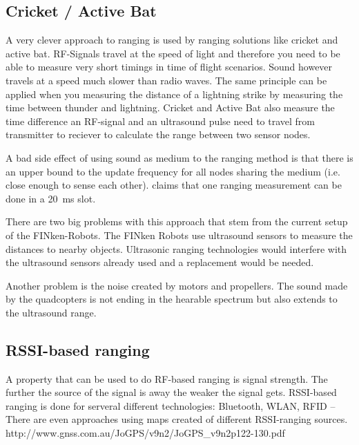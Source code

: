\subsection{Cricket / Active Bat}
A very clever approach to ranging is used by ranging solutions like cricket\cite{cricket_01} and active bat\cite{active_bat}. 
RF-Signals travel at the speed of light and therefore you need to be able to measure very short timings in time of flight scenarios.
Sound however travels at a speed much slower than radio waves.
The same principle can be applied when you measuring the distance of a lightning strike by measuring the time between thunder and lightning.
Cricket and Active Bat also measure the time difference an RF-signal and an ultrasound pulse need to travel from transmitter to reciever to calculate the range between two sensor nodes.

A bad side effect of using sound as medium to the ranging method is that there is an upper bound to the update frequency for all nodes sharing the medium (i.e. close enough to sense each other). \cite{active_bat} claims that one ranging measurement can be done in a \SI{20}{\milli\second} slot.


There are two big problems with this approach that stem from the current setup of the FINken-Robots.
The FINken Robots use ultrasound sensors to measure the distances to nearby objects.
Ultrasonic ranging technologies would interfere with the ultrasound sensors already used and a replacement would be needed.

Another problem is the noise created by motors and propellers.
The sound made by the quadcopters is not ending in the hearable spectrum but also extends to the ultrasound range.

\subsection{RSSI-based ranging}

A property that can be used to do RF-based ranging is signal strength.
The further the source of the signal is away the weaker the signal gets.
RSSI-based ranging is done for serveral different technologies: Bluetooth, WLAN, RFID –
There are even approaches using maps created of different RSSI-ranging sources. http://www.gnss.com.au/JoGPS/v9n2/JoGPS\_v9n2p122-130.pdf 

